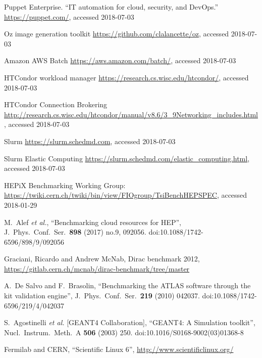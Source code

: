 \begin{thebibliography}{}
Puppet Enterprise. ``IT automation for cloud, security, and DevOps.''
\url{https://puppet.com/}, accessed 2018-07-03


Oz image generation toolkit
\url{https://github.com/clalancette/oz}, accessed 2018-07-03

Amazon AWS Batch
\url{https://aws.amazon.com/batch/}, accessed 2018-07-03

HTCondor workload manager
\url{https://research.cs.wisc.edu/htcondor/}, accessed 2018-07-03

HTCondor Connection Brokering
\url{http://research.cs.wisc.edu/htcondor/manual/v8.6/3_9Networking_includes.html}, accessed 2018-07-03

  Slurm
  \url{https://slurm.schedmd.com}, accessed 2018-07-03
    
Slurm Elastic Computing
\url{https://slurm.schedmd.com/elastic_computing.html}, accessed 2018-07-03


 HEPiX Benchmarking Working Group:
\url{https://twiki.cern.ch/twiki/bin/view/FIOgroup/TsiBenchHEPSPEC}, accessed 2018-01-29


M.~Alef {\it et al.},
``Benchmarking cloud resources for HEP'',
J.\ Phys.\ Conf.\ Ser.\  {\bf 898} (2017) no.9,  092056.
doi:10.1088/1742-6596/898/9/092056

Graciani, Ricardo and Andrew McNab, Dirac benchmark 2012, 
\url{https://gitlab.cern.ch/mcnab/dirac-benchmark/tree/master}

A.~De Salvo and F.~Brasolin,
``Benchmarking the ATLAS software through the kit validation engine'',
J.\ Phys.\ Conf.\ Ser.\  {\bf 219} (2010) 042037.
doi:10.1088/1742-6596/219/4/042037

S.~Agostinelli {\it et al.} [GEANT4 Collaboration],        
``GEANT4: A Simulation toolkit'',                          
Nucl.\ Instrum.\ Meth.\ A {\bf 506} (2003) 250.            
doi:10.1016/S0168-9002(03)01368-8                          

Fermilab and CERN,
``Scientific Linux 6'',
\url{http://www.scientificlinux.org/}


\end{thebibliography}
